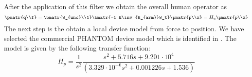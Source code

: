 After the application of this filter we obtain the overall human operator as
\[
\pmatr{q\\f} = \bmatr{W_{unc}\\1}\bmatr{-1 &\inv{H_{arm}}W_t}\pmatr{p\\x} = H_u \pmatr{p\\x}
\]
The next step is the obtain a local device model from force to position. We have selected the commercial PHANTOM device model which is identified in \cite{cavusfeygintendick}. The model is given by the following transfer function: 
\[
H_p = \frac{1}{s^2}\frac{s^2 + 5.716 s + 9.201\cdot 10^{4}}{(3.329\cdot 10^{-6} s^2 + 0.001226 s+1.536)}
\]


